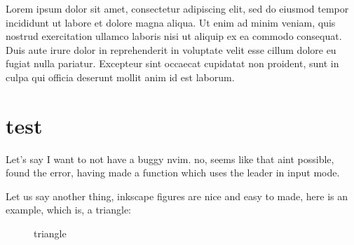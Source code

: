 \documentclass{article}
\begin{document}
\tableofcontents

Lorem ipsum dolor sit amet, consectetur adipiscing elit, sed do eiusmod tempor
incididunt ut labore et dolore magna aliqua. Ut enim ad minim veniam, quis
nostrud exercitation ullamco laboris nisi ut aliquip ex ea commodo consequat.
Duis aute irure dolor in reprehenderit in voluptate velit esse cillum dolore eu
fugiat nulla pariatur. Excepteur sint occaecat cupidatat non proident, sunt in
culpa qui officia deserunt mollit anim id est laborum.

\section{test}

Let's say I want to not have a buggy nvim. no, seems like that aint possible,
found the error, having made a function which uses the leader in input mode.

Let us say another thing, inkscape figures are nice and easy to made, here is
an example, which is, a triangle:

\begin{figure}[ht]
    \centering
    \caption{triangle}
    \label{fig:triangle}
\end{figure}
\end{document}
